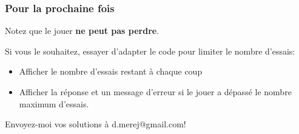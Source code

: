 \documentclass{beamer}
\begin{document}
\begin{frame}[fragile]
  \frametitle{Pour la prochaine fois}

Notez que le jouer \textbf{ne peut pas perdre}.

\vfill

Si vous le souhaitez, essayer d'adapter le code pour limiter le nombre d'essais:

\begin{itemize}
  \item Afficher le nombre d'essais restant à chaque coup
  \item Afficher la réponse et un message d'erreur si le jouer a dépassé le
    nombre maximum d'essais.
\end{itemize}

Envoyez-moi vos solutions à d.merej@gmail.com!

\end{frame}
\end{document}
